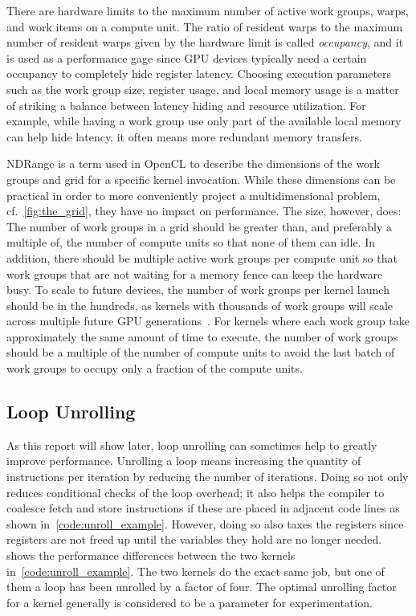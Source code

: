 \documentclass[11pt,twoside]{report}
\begin{document}
\indent There are hardware limits to the maximum number of active work groups, warps, and work items on a compute unit. The ratio of resident warps to the maximum number of resident warps given by the hardware limit is called {\it occupancy}, and it is used as a performance gage since GPU devices typically need a certain occupancy to completely hide register latency. Choosing execution parameters such as the work group size, register usage, and local memory usage is a matter of striking a balance between latency hiding and resource utilization. For example, while having a work group use only part of the available local memory can help hide latency, it often means more redundant memory transfers.

\indent NDRange is a term used in OpenCL to describe the dimensions of the work groups and grid for a specific kernel invocation. While these dimensions can be practical in order to more conveniently project a multidimensional problem, cf.~\cref{fig:the_grid}, they have no impact on performance. The size, however, does: The number of work groups in a grid should be greater than, and preferably a multiple of, the number of compute units so that none of them can idle.  In addition, there should be multiple active work groups per compute unit so that work groups that are not waiting for a memory fence can keep the hardware busy. To scale to future devices, the number of work groups per kernel launch should be in the hundreds, as kernels with thousands of work groups will scale across multiple future GPU generations~\cite{opencl.best.practices}.  For kernels where each work group take approximately the same amount of time to execute, the number of work groups should be a multiple of the number of compute units to avoid the last batch of work groups to occupy only a fraction of the compute units. 

\subsection{Loop Unrolling\label{sec:unroll}}

As this report will show later, loop unrolling can sometimes help to greatly improve performance. Unrolling a loop means  increasing the quantity of instructions per iteration by reducing the number of iterations. Doing so not only reduces conditional checks of the loop overhead; it also helps the compiler to coalesce fetch and store instructions if these are placed in adjacent code lines as shown in~\cref{code:unroll_example}. However, doing so also taxes the registers since registers are not freed up until the variables they hold are no longer needed.  shows the performance differences between the two kernels in~\cref{code:unroll_example}. The two kernels do the exact same job, but one of them a loop has been unrolled by a factor of four. The optimal unrolling factor for a kernel generally is considered to be a parameter for experimentation. 
\end{document}
